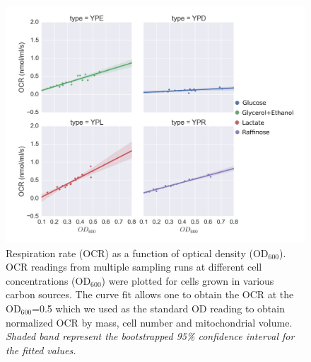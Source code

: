 %
%
\begin{figure}[htp]
	\centering
    \includegraphics[width=\textwidth]{OCRraw}
    \caption[Respiration rate (OCR) as a function of optical density (OD$_{600}$).]{Respiration rate (OCR) as a function of optical density (OD$_{600}$).\\OCR readings from multiple sampling runs at different cell concentrations (OD$_{600}$) were plotted for cells grown in various carbon sources. The curve fit allows one to obtain the OCR at the OD$_{600}$=0.5 which we used as the standard OD reading to obtain normalized OCR by mass, cell number and mitochondrial volume.\\
\emph{Shaded band represent the bootstrapped 95\% confidence interval for the fitted values.}}\label{fig:OCRraw}
\end{figure}
%
%
